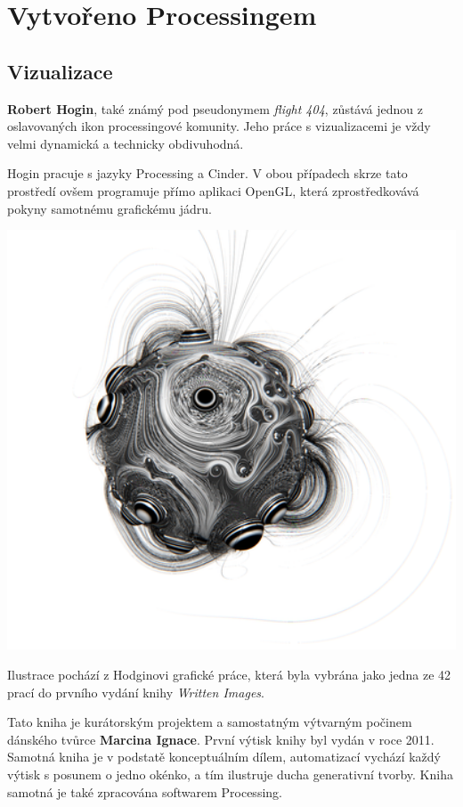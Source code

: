 \documentclass[10pt]{book}
\newcommand{\oddil}[1]{\section{#1}\index{#1}\label{#1}}
\begin{document}
\chapter{Vytvořeno Processingem}

\oddil{Vizualizace}

\textbf{Robert Hogin}, také známý pod pseudonymem {\em flight 404}, zůstává jednou z oslavovaných ikon processingové komunity. Jeho práce s vizualizacemi je vždy velmi dynamická a technicky obdivuhodná.

Hogin pracuje s jazyky Processing a Cinder. V obou případech skrze tato prostředí ovšem programuje přímo aplikaci OpenGL, která zprostředkovává pokyny samotnému grafickému jádru.

\vfill
\begin{centering}
\includegraphics[width = 1\textwidth]{imgs/hogin.png}
\end{centering}

Ilustrace pochází z Hodginovi grafické práce, která byla vybrána jako jedna ze 42 prací do prvního vydání knihy {\em Written Images}.

Tato kniha je kurátorským projektem a samostatným výtvarným počinem dánského tvůrce \textbf{Marcina Ignace}. První výtisk knihy byl vydán v roce 2011. Samotná kniha je v podstatě konceptuálním dílem, automatizací vychází každý výtisk s posunem o jedno okénko, a tím ilustruje ducha generativní tvorby. Kniha samotná je také zpracována softwarem Processing. \vfill
\end{document}
